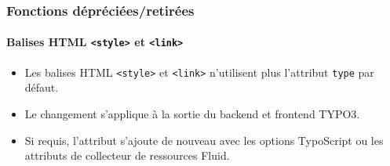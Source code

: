 %

\begin{frame}[fragile]
	\frametitle{Fonctions dépréciées/retirées}
	\framesubtitle{Balises HTML \texttt{<style>} et \texttt{<link>}}

	\begin{itemize}
		\item Les balises HTML \texttt{<style>} et \texttt{<link>} n'utilisent plus
			l'attribut \texttt{type} par défaut.
		\item Le changement s'applique à la sortie du backend et frontend TYPO3.
		\item Si requis, l'attribut s'ajoute de nouveau avec les options TypoScript
			ou les attributs de collecteur de ressources Fluid.
	\end{itemize}

\end{frame}

